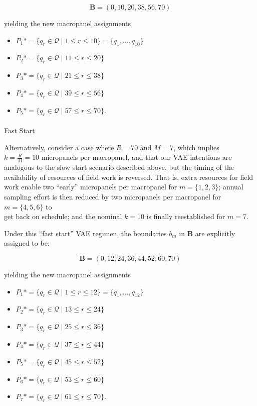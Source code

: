 \documentclass[
  number]{elsarticle}
\makeatletter
\let\oldparagraph\paragraph
\renewcommand{\paragraph}{
    \@ifstar
      \xxxParagraphStar
      \xxxParagraphNoStar
  }
\newcommand{\xxxParagraphStar}[1]{\oldparagraph*{#1}\mbox{}}
\newcommand{\xxxParagraphNoStar}[1]{\oldparagraph{#1}\mbox{}}
\providecommand{\tightlist}{%
  \setlength{\itemsep}{0pt}\setlength{\parskip}{0pt}}
\makeatother
\begin{document}
\[\mathbf{B} = (0, 10, 20, 38, 56, 70)\]

yielding the new macropanel assignments

\begin{itemize}
\tightlist
\item
  \(P_1* = \{ q_r \in \mathcal{Q} \mid 1 \leq r \leq 10 \} = \{q_1,\ldots,q_{10}\}\)
\item
  \(P_2* = \{ q_r \in \mathcal{Q} \mid 11 \leq r \leq 20 \}\)
\item
  \(P_3* = \{ q_r \in \mathcal{Q} \mid 21 \leq r \leq 38 \}\)
\item
  \(P_4* = \{ q_r \in \mathcal{Q} \mid 39 \leq r \leq 56 \}\)
\item
  \(P_5* = \{ q_r \in \mathcal{Q} \mid 57 \leq r \leq 70 \}.\)
\end{itemize}

\paragraph{Fast Start}\label{fast-start-1}

Alternatively, consider a case where \(R = 70\) and \(M = 7\), which
implies \(k = \frac{R}{M} = 10\) micropanels per macropanel, and that
our VAE intentions are analogous to the slow start scenario described
above, but the timing of the availability of resources of field work is
reversed. That is, extra resources for field work enable two ``early''
micropanels per macropanel for \(m = \{1,2,3\}\); annual sampling effort
is then reduced by two micropanels per macropanel for \(m = \{4,5,6\}\)
to\\
get back on schedule; and the nominal \(k = 10\) is finally
reestablished for \(m = 7\).

Under this ``fast start'' VAE regimen, the boundaries \(b_m\) in
\(\mathbf{B}\) are explicitly assigned to be:

\[\mathbf{B} = (0, 12, 24, 36, 44, 52, 60, 70)\]

yielding the new macropanel assignments

\begin{itemize}
\tightlist
\item
  \(P_1* = \{ q_r \in \mathcal{Q} \mid 1 \leq r \leq 12 \} = \{q_1,\ldots,q_{12}\}\)
\item
  \(P_2* = \{ q_r \in \mathcal{Q} \mid 13 \leq r \leq 24 \}\)
\item
  \(P_3* = \{ q_r \in \mathcal{Q} \mid 25 \leq r \leq 36 \}\)
\item
  \(P_4* = \{ q_r \in \mathcal{Q} \mid 37 \leq r \leq 44 \}\)
\item
  \(P_5* = \{ q_r \in \mathcal{Q} \mid 45 \leq r \leq 52 \}\)
\item
  \(P_6* = \{ q_r \in \mathcal{Q} \mid 53 \leq r \leq 60 \}\)
\item
  \(P_7* = \{ q_r \in \mathcal{Q} \mid 61 \leq r \leq 70 \}.\)
\end{itemize}
\end{document}
